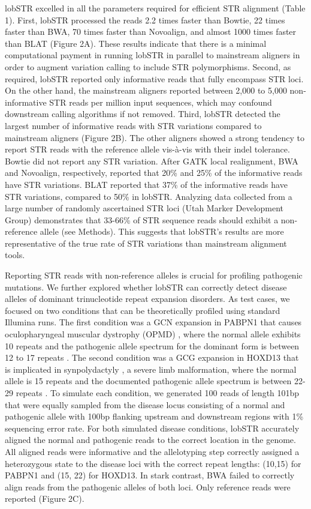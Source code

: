 lobSTR excelled in all the parameters required for efficient STR alignment (Table 1). First, lobSTR processed the reads 2.2 times faster than Bowtie, 22 times faster than BWA, 70 times faster than Novoalign, and almost 1000 times faster than BLAT (Figure 2A). These results indicate that there is a minimal computational payment in running lobSTR in parallel to mainstream aligners in order to augment variation calling to include STR polymorphisms. Second, as required, lobSTR reported only informative reads that fully encompass STR loci. On the other hand, the mainstream aligners reported between 2,000 to 5,000 non-informative STR reads per million input sequences, which may confound downstream calling algorithms if not removed. Third, lobSTR detected the largest number of informative reads with STR variations compared to mainstream aligners (Figure 2B). The other aligners showed a strong tendency to report STR reads with the reference allele vis-à-vis with their indel tolerance. Bowtie did not report any STR variation. After GATK local realignment, BWA and Novoalign, respectively, reported that 20\% and 25\% of the informative reads have STR variations. BLAT reported that 37\% of the informative reads have STR variations, compared to 50\% in lobSTR. Analyzing data collected from a large number of randomly ascertained STR loci \cite{PayseurJingHaasl2011} (Utah Marker Development Group) demonstrates that 33-66\% of STR sequence reads should exhibit a non-reference allele (see Methods). This suggests that lobSTR’s results are more representative of the true rate of STR variations than mainstream alignment tools.

Reporting STR reads with non-reference alleles is crucial for profiling pathogenic mutations. We further explored whether lobSTR can correctly detect disease alleles of dominant trinucleotide repeat expansion disorders. As test cases, we focused on two conditions that can be theoretically profiled using standard Illumina runs. The first condition was a GCN expansion in PABPN1 that causes oculopharyngeal muscular dystrophy (OPMD) \cite{BraisBouchardXieEtAl1998}, where the normal allele exhibits 10 repeats and the pathogenic allele spectrum for the dominant form is between 12 to 17 repeats \cite{PearsonNicholEdamuraCleary2005}. The second condition was a GCG expansion in HOXD13 that is implicated in synpolydactyly \cite{MuragakiMundlosUptonEtAl1996}, a severe limb malformation, where the normal allele is 15 repeats and the documented pathogenic allele spectrum is between 22-29 repeats \cite{PearsonNicholEdamuraCleary2005}. To simulate each condition, we generated 100 reads of length 101bp that were equally sampled from the disease locus consisting of a normal and pathogenic allele with 100bp flanking upstream and downstream regions with 1\% sequencing error rate. For both simulated disease conditions, lobSTR accurately aligned the normal and pathogenic reads to the correct location in the genome. All aligned reads were informative and the allelotyping step correctly assigned a heterozygous state to the disease loci with the correct repeat lengths: (10,15) for PABPN1 and (15, 22) for HOXD13. In stark contrast, BWA failed to correctly align reads from the pathogenic alleles of both loci. Only reference reads were reported (Figure 2C).

